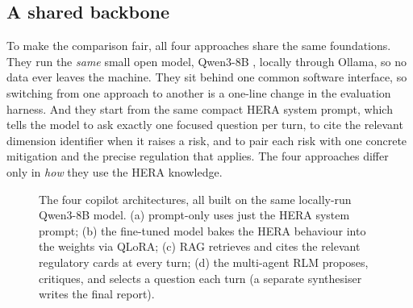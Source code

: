 \documentclass[11pt]{article}
\begin{document}
\subsection{A shared backbone}

To make the comparison fair, all four approaches share the same foundations. They run the
\emph{same} small open model, Qwen3-8B \citep{qwen3}, locally through Ollama, so no data
ever leaves the machine. They sit behind one common software interface, so switching from
one approach to another is a one-line change in the evaluation harness. And they start
from the same compact HERA system prompt, which tells the model to ask exactly one
focused question per turn, to cite the relevant dimension identifier when it raises a
risk, and to pair each risk with one concrete mitigation and the precise regulation that
applies. The four approaches differ only in \emph{how} they use the HERA knowledge.

\begin{figure}[t]
\centering
{}
\caption{The four copilot architectures, all built on the same locally-run Qwen3-8B
model. (a) prompt-only uses just the HERA system prompt; (b) the fine-tuned model bakes
the HERA behaviour into the weights via QLoRA; (c) RAG retrieves and cites the relevant
regulatory cards at every turn; (d) the multi-agent RLM proposes, critiques, and selects
a question each turn (a separate synthesiser writes the final report).}
\label{fig:arch}
\end{figure}
\end{document}
